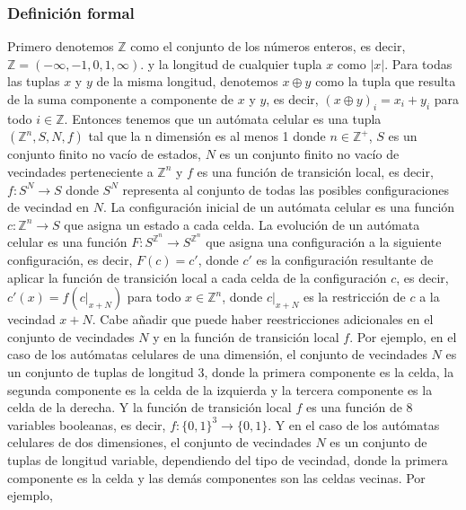 \subsubsection{Definici\'on formal}
    \label{sec:AutomatasCelDefFormal}
    Primero denotemos $\mathbb{Z}$ como el conjunto de los n\'umeros enteros, es decir, $\mathbb{Z} = (-\infty,-1 ,0,1, \infty)$.
        y la longitud de cualquier tupla $x$ como $|x|$. Para todas las tuplas $x$ y $y$ de la misma longitud, denotemos $x \oplus y$
        como la tupla que resulta de la suma componente a componente de $x$ y $y$, es decir, $(x \oplus y)_i = x_i + y_i$ para todo 
        $i \in \mathbb{Z}$.
    \vskip 0.5cm
    Entonces tenemos que un aut\'omata celular es una tupla $({\mathbb{Z}^{n}},S,N,f)$ tal que la n dimensi\'on es al menos 1 donde 
        $n \in \mathbb{Z}^{+}$, $S$ es un conjunto finito no vac\'io de estados, $N$ es un conjunto finito no vac\'io de vecindades 
        perteneciente a ${\mathbb{Z}^{n}}$ y $f$ es una funci\'on de transici\'on local, es decir, $f: S^N \rightarrow S$ donde
        $S^N$ representa al conjunto de todas las posibles configuraciones de vecindad en $N$.
    \vskip 0.5cm
    La configuraci\'on inicial de un aut\'omata celular es una funci\'on $c: {\mathbb{Z}^{n}} \rightarrow S$ que asigna un estado a cada celda.
        La evoluci\'on de un aut\'omata celular es una funci\'on $F: S^{{\mathbb{Z}^{n}}} \rightarrow S^{{\mathbb{Z}^{n}}}$ que asigna una configuraci\'on a la siguiente
        configuraci\'on, es decir, $F(c) = c'$, donde $c'$ es la configuraci\'on resultante de aplicar la funci\'on de transici\'on local a cada
        celda de la configuraci\'on $c$, es decir, $c'(x) = f(c|_{x+N})$ para todo $x \in {\mathbb{Z}^{n}}$, donde $c|_{x+N}$ es la restricci\'on de $c$ a la vecindad $x+N$.
    \vskip 0.5cm
    Cabe a\~nadir que puede haber reestricciones adicionales en el conjunto de vecindades $N$ y en la funci\'on de transici\'on local $f$.
        Por ejemplo, en el caso de los aut\'omatas celulares de una dimensi\'on, el conjunto de vecindades $N$ es un conjunto de tuplas de longitud 3,
        donde la primera componente es la celda, la segunda componente es la celda de la izquierda y la tercera componente es la celda de la derecha.
        Y la funci\'on de transici\'on local $f$ es una funci\'on de 8 variables booleanas, es decir, $f: \{0,1\}^3 \rightarrow \{0,1\}$.
    \vskip 0.5cm    
    Y en el caso de los aut\'omatas celulares de dos dimensiones, el conjunto de vecindades $N$ es un conjunto de tuplas de longitud variable, 
        dependiendo del tipo de vecindad, donde la primera componente es la celda y las dem\'as componentes son las celdas vecinas. Por ejemplo, 
